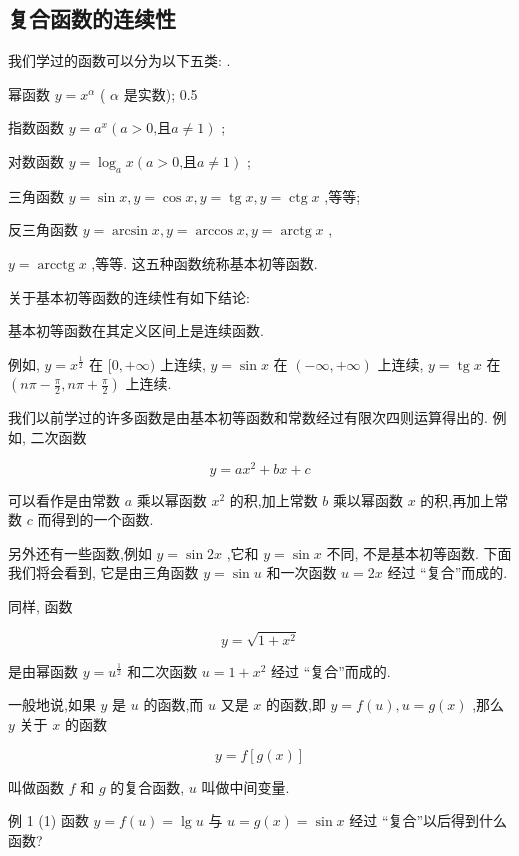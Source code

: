 \documentclass[lang=cn,newtx,10pt,scheme=chinese]{elegantbook}
\begin{document}
\subsection*{复合函数的连续性}
我们学过的函数可以分为以下五类: .

幂函数 \(y = {x}^{\alpha }\) ( \(\alpha\) 是实数); 0.5

指数函数 \(y = {a}^{x}\left( {a > 0\text{,且}a \neq 1}\right)\) ;

对数函数 \(y = {\log }_{a}x\left( {a > 0\text{,且}a \neq 1}\right)\) ;

三角函数 \(y = \sin x,y = \cos x,y = \operatorname{tg}x,y = \operatorname{ctg}x\) ,等等;

反三角函数 \(y = \arcsin x,y = \arccos x,y = \operatorname{arctg}x\) ,

\(y = \operatorname{arcctg}x\) ,等等. 这五种函数统称基本初等函数.

关于基本初等函数的连续性有如下结论:

基本初等函数在其定义区间上是连续函数.

例如, \(y = {x}^{\frac{1}{2}}\) 在 \(\lbrack 0, + \infty )\) 上连续, \(y = \sin x\) 在 \(\left( {-\infty , + \infty }\right)\) 上连续, \(y = \operatorname{tg}x\) 在 \(\left( {{n\pi } - \frac{\pi }{2},{n\pi } + \frac{\pi }{2}}\right)\) 上连续.

我们以前学过的许多函数是由基本初等函数和常数经过有限次四则运算得出的. 例如, 二次函数

\[
y = a{x}^{2} + {bx} + c
\]

可以看作是由常数 \(a\) 乘以幂函数 \({x}^{2}\) 的积,加上常数 \(b\) 乘以幂函数 \(x\) 的积,再加上常数 \(c\) 而得到的一个函数.

另外还有一些函数,例如 \(y = \sin {2x}\) ,它和 \(y = \sin x\) 不同, 不是基本初等函数. 下面我们将会看到, 它是由三角函数 \(y = \sin u\) 和一次函数 \(u = {2x}\) 经过 “复合”而成的.

同样, 函数

\[
y = \sqrt{1 + {x}^{2}}
\]

是由幂函数 \(y = {u}^{\frac{1}{2}}\) 和二次函数 \(u = 1 + {x}^{2}\) 经过 “复合”而成的.

一般地说,如果 \(y\) 是 \(u\) 的函数,而 \(u\) 又是 \(x\) 的函数,即 \(y = f\left( u\right) ,u = g\left( x\right)\) ,那么 \(y\) 关于 \(x\) 的函数

\[
y = f\left\lbrack {g\left( x\right) }\right\rbrack
\]

叫做函数 \(f\) 和 \(g\) 的复合函数, \(u\) 叫做中间变量.

例 1 (1) 函数 \(y = f\left( u\right) = \lg u\) 与 \(u = g\left( x\right) = \sin x\) 经过 “复合”以后得到什么函数?
\end{document}
